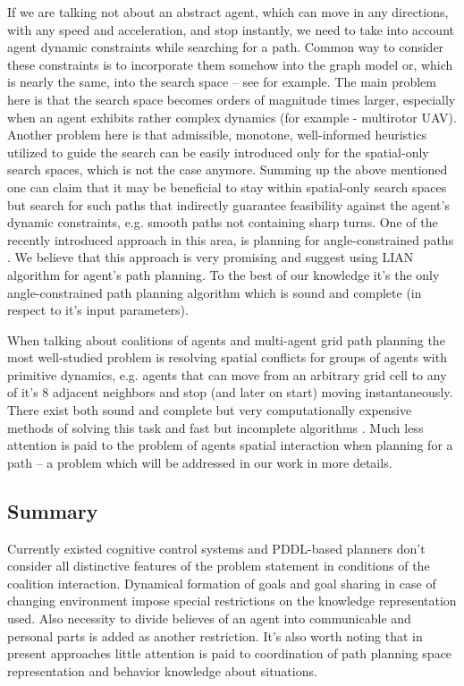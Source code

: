 \documentclass[runningheads,a4paper]{llncs}
\begin{document}
If we are talking not about an abstract agent, which can move in any directions, with any speed and acceleration, and stop instantly, we need to take into account agent dynamic constraints while searching for a path. Common way to consider these constraints is to incorporate them somehow into the graph model or, which is nearly the same, into the search space – see \cite{Kuwata2009} for example. The main problem here is that the search space becomes orders of magnitude times larger, especially when an agent exhibits rather complex dynamics (for example - multirotor UAV).  Another problem here is that admissible, monotone, well-informed heuristics utilized to guide the search can be easily introduced only for the spatial-only search spaces, which is not the case anymore. Summing up the above mentioned one can claim that it may be beneficial to stay within spatial-only search spaces but search for such paths that indirectly guarantee feasibility against the agent's dynamic constraints, e.g. smooth paths not containing sharp turns.  One of the recently introduced approach in this area, is planning for angle-constrained paths \cite{Kim2014}. We believe that this approach is very promising and suggest using LIAN algorithm \cite{Yakovlev2015} for agent's path planning. To the best of our knowledge it's the only angle-constrained path planning algorithm which is sound and complete (in respect to it's input parameters). 

When talking about coalitions of agents and multi-agent grid path planning the most well-studied problem is resolving spatial conflicts for groups of agents with primitive dynamics, e.g. agents that can move from an arbitrary grid cell to any of it's 8 adjacent neighbors and stop (and later on start) moving instantaneously. There exist both sound and complete but very computationally expensive methods of solving this task \cite{Standley2010} and fast but incomplete algorithms \cite{Wang2008,Silver2006}. Much less attention is paid to the problem of agents spatial interaction when planning for a path – a problem which will be addressed in our work in more details.

\subsection{Summary}
Currently existed cognitive control systems and PDDL-based planners don't consider all distinctive features of the problem statement in conditions of the coalition interaction. Dynamical formation of goals and goal sharing in case of changing environment impose special restrictions on the knowledge representation used. Also necessity to divide believes of an agent into communicable and personal parts is added as another restriction. It's also worth noting that in present approaches little attention is paid to coordination of path planning space representation and behavior knowledge about situations.
\end{document}
